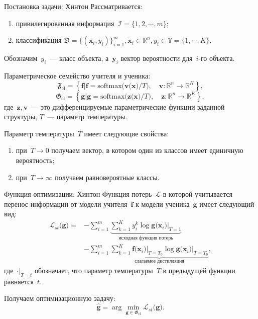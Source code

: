 \documentclass[9pt,pdf,hyperref={unicode}]{beamer}
\begin{document}
\begin{frame}{Постановка задачи: Хинтон}
\justifying
Рассматривается:
\begin{enumerate}
	\item привилегированная информация~$\mathcal{I} = \{1, 2, \cdots, m\}$;
	\item классификация $\mathfrak{D} = \{\left(\mathbf{x}_i, y_i\right)\}_{i=1}^{m}, \mathbf{x}_i \in \mathbb{R}^{n}, y_i \in \mathbb{Y}=\{1, \cdots, K\}$.
\end{enumerate}
Обозначим~$y_i$~--- класс объекта, а~$\mathbf{y}_i$ вектор вероятности для~$i$-го объекта.

Параметрическое семейство учителя и ученика:
\[
\mathfrak{F}_{\text{cl}} = \left\{\mathbf{f}| \mathbf{f} = \text{softmax}\bigr(\mathbf{v}\bigr(\mathbf{x}\bigr)/T\bigr), \quad \mathbf{v}: \mathbb{R}^n \to \mathbb{R}^K \right\},
\]
\[
\mathfrak{G}_{\text{cl}} = \left\{\mathbf{g}| \mathbf{g} = \text{softmax}\bigr(\mathbf{z}\bigr(\mathbf{x}\bigr)/T\bigr), \quad \mathbf{z}: \mathbb{R}^n \to \mathbb{R}^K \right\},
\]
где~$\mathbf{z},\mathbf{v}$~--- это дифференцируемые параметрические функции заданной структуры, $T$~--- параметр температуры.

Параметр температуры~$T$ имеет следующие свойства:
\begin{enumerate}
    \item при~$T\to 0$ получаем вектор, в котором один из классов имеет единичную вероятность;
    \item при~$T\to \infty$ получаем равновероятные классы.
\end{enumerate}
\end{frame}
\begin{frame}{Функция оптимизации: Хинтон}
\justifying
Функция потерь~$\mathcal{L}$ в которой учитывается перенос информации от модели учителя~$\mathbf{f}$ к модели ученика~$\mathbf{g}$ имеет следующий вид:
\[
\begin{aligned}
   \mathcal{L}_{st}\bigr(\mathbf{g}\bigr) = &-\sum_{i=1}^{m}\underbrace{{\sum_{k=1}^{K}y^k_i\log\mathbf{g}\bigr(\mathbf{x}_i\bigr)\bigr|_{T=1}}}_{\text{исходная функция потерь}}\\
   &-\sum_{i=1}^{m}\underbrace{{\sum_{k=1}^{K}\mathbf{f}\bigr(\mathbf{x}_i\bigr)\bigr|_{T=T_0}\log\mathbf{g}\bigr(\mathbf{x}_i\bigr)\bigr|_{T=T_0}}}_{\text{слагаемое дистилляция}},
\end{aligned}
\]
где~$\cdot\bigr|_{T=t}$ обозначает, что параметр температуры~$T$ в предыдущей функции равняется~$t$.

Получаем оптимизационную задачу:
\[
   \hat{\mathbf{g}} = \arg\min_{\mathbf{g} \in \mathfrak{G}_{\text{cl}}} \mathcal{L}_{st}\bigr(\mathbf{g}\bigr).
\]
\end{frame}
\end{document}
